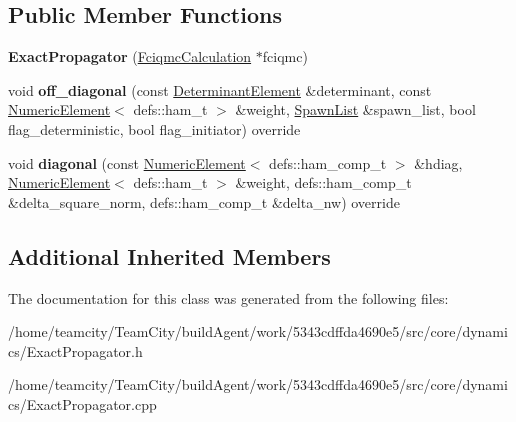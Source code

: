 \subsection*{Public Member Functions}
\begin{DoxyCompactItemize}
\item 
{\bfseries Exact\+Propagator} (\hyperlink{classFciqmcCalculation}{Fciqmc\+Calculation} $\ast$fciqmc)\hypertarget{classExactPropagator_a92e82e76311ae33ca8923dc62f75681c}{}\label{classExactPropagator_a92e82e76311ae33ca8923dc62f75681c}

\item 
void {\bfseries off\+\_\+diagonal} (const \hyperlink{classDeterminantElement}{Determinant\+Element} \&determinant, const \hyperlink{classNumericElement}{Numeric\+Element}$<$ defs\+::ham\+\_\+t $>$ \&weight, \hyperlink{structSpawnList}{Spawn\+List} \&spawn\+\_\+list, bool flag\+\_\+deterministic, bool flag\+\_\+initiator) override\hypertarget{classExactPropagator_abf77c975186a42ce705420706e675150}{}\label{classExactPropagator_abf77c975186a42ce705420706e675150}

\item 
void {\bfseries diagonal} (const \hyperlink{classNumericElement}{Numeric\+Element}$<$ defs\+::ham\+\_\+comp\+\_\+t $>$ \&hdiag, \hyperlink{classNumericElement}{Numeric\+Element}$<$ defs\+::ham\+\_\+t $>$ \&weight, defs\+::ham\+\_\+comp\+\_\+t \&delta\+\_\+square\+\_\+norm, defs\+::ham\+\_\+comp\+\_\+t \&delta\+\_\+nw) override\hypertarget{classExactPropagator_a3c34937011afc40435b9a75d1345b101}{}\label{classExactPropagator_a3c34937011afc40435b9a75d1345b101}

\end{DoxyCompactItemize}
\subsection*{Additional Inherited Members}


The documentation for this class was generated from the following files\+:\begin{DoxyCompactItemize}
\item 
/home/teamcity/\+Team\+City/build\+Agent/work/5343cdffda4690e5/src/core/dynamics/Exact\+Propagator.\+h\item 
/home/teamcity/\+Team\+City/build\+Agent/work/5343cdffda4690e5/src/core/dynamics/Exact\+Propagator.\+cpp\end{DoxyCompactItemize}
